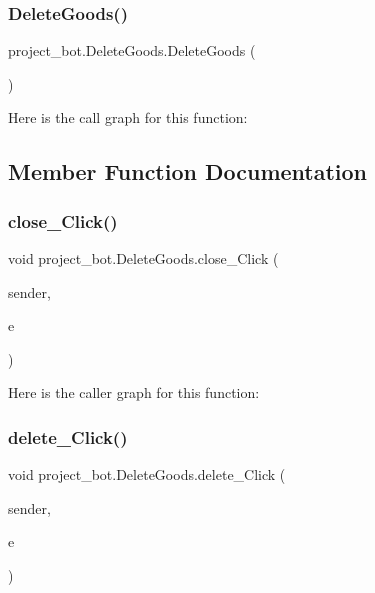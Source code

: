 \subsubsection{\texorpdfstring{Delete\+Goods()}{DeleteGoods()}}
{\footnotesize\ttfamily project\+\_\+bot.\+Delete\+Goods.\+Delete\+Goods (\begin{DoxyParamCaption}{ }\end{DoxyParamCaption})}

Here is the call graph for this function\+:


\subsection{Member Function Documentation}
\mbox{\label{classproject__bot_1_1_delete_goods_a845f1fe8c54f6b239984ce0916754cb8}} 
\subsubsection{\texorpdfstring{close\+\_\+\+Click()}{close\_Click()}}
{\footnotesize\ttfamily void project\+\_\+bot.\+Delete\+Goods.\+close\+\_\+\+Click (\begin{DoxyParamCaption}\item[{object}]{sender,  }\item[{Event\+Args}]{e }\end{DoxyParamCaption})\hspace{0.3cm}{\ttfamily [private]}}

Here is the caller graph for this function\+:
\mbox{\label{classproject__bot_1_1_delete_goods_a4aac5de189012c1bb7c1161b019b97a8}} 
\subsubsection{\texorpdfstring{delete\+\_\+\+Click()}{delete\_Click()}}
{\footnotesize\ttfamily void project\+\_\+bot.\+Delete\+Goods.\+delete\+\_\+\+Click (\begin{DoxyParamCaption}\item[{object}]{sender,  }\item[{Event\+Args}]{e }\end{DoxyParamCaption})\hspace{0.3cm}{\ttfamily [private]}}


